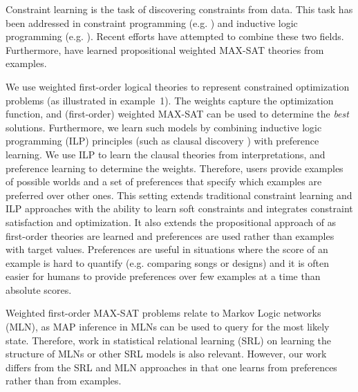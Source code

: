 \documentclass[letterpaper]{article}
\theoremstyle{definition}
\begin{document}
Constraint learning is the task of discovering constraints from data.
This task has been addressed in constraint programming (e.g. \cite{Beldiceanu:ModelSeeker,bessiere2013constraint}) and inductive logic programming (e.g. \cite{DeRaedt:ClausalDiscovery}).
Recent efforts \cite{Lallouet:LearningCP} have attempted to combine these two fields.
Furthermore, \cite{campigotto2011active} have learned propositional weighted MAX-SAT theories from examples.

We use weighted first-order logical theories to represent constrained optimization problems (as illustrated in example~1).
The weights capture the optimization function, and (first-order) weighted MAX-SAT can be used to determine the \emph{best} solutions.
Furthermore, we learn such models by combining inductive logic programming (ILP) principles (such as clausal discovery \cite{DeRaedt:ClausalDiscovery}) with preference learning.
We use ILP to learn the clausal theories from interpretations, and preference learning to determine the weights.
Therefore, users provide examples of possible worlds and a set of preferences that specify which examples are preferred over other ones.
This setting extends traditional constraint learning and ILP approaches with the ability to learn soft constraints and integrates constraint satisfaction and optimization.
It also extends the propositional approach of \cite{campigotto2011active} as first-order theories are learned and preferences are used rather than examples with target values.
Preferences are useful in situations where the score of an example is hard to quantify (e.g. comparing songs or designs) and it is often easier for humans to provide preferences over few examples at a time than absolute scores.

Weighted first-order MAX-SAT problems relate to Markov Logic networks (MLN), as MAP inference in MLNs can be used to query for the most likely state.
Therefore, work in statistical relational learning (SRL) on learning the structure of MLNs or other SRL models \cite{kok2005learning} is also relevant.
However, our work differs from the SRL and MLN approaches in that one learns from preferences rather than from examples.


\end{document}

